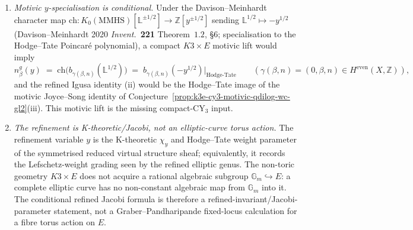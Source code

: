 \begin{proposition}
\begin{enumerate}[label=\textup{(\roman*)},leftmargin=1.5em]
\[\]
where $\chi_{10}(q, \tilde q, p; y)$ is the refined Jacobi/paramodular lift of the refined elliptic-genus input \(\phi_{0,1}^{\mathrm{ref}}=\phi_{0,1}-(y-2+y^{-1})\phi_{-2,1}\), and \(C^{\mathrm{ref}}|_{y=1}=C\). Specialising \(y=1\) recovers the primitive reduced Igusa scalar of Proposition~\ref{prop:k3e-cy3-pt-stable-pairs-cosection}(ii).
\item \emph{Motivic \(y\)-specialisation is conditional.} Under the Davison--Meinhardt character map $\mathrm{ch} \colon K_{0}(\mathrm{MMHS})[\mathbb L^{\pm 1/2}] \to \mathbb Z[y^{\pm 1/2}]$ sending $\mathbb L^{1/2} \mapsto -y^{1/2}$ \textup{(}Davison--Meinhardt 2020 \emph{Invent.}~\textbf{221} Theorem~$1.2$, \S 6; specialisation to the Hodge--Tate Poincar\'e polynomial\textup{)}, a compact \(K3\times E\) motivic lift would imply
\[
 n^{g}_{\beta}(y) \;=\; \mathrm{ch}\!\bigl(b_{\gamma(\beta, n)}(\mathbb L^{1/2})\bigr) \;=\; b_{\gamma(\beta, n)}(-y^{1/2}) \big|_{\mathrm{Hodge\text{-}Tate}} \qquad (\gamma(\beta, n) = (0, \beta, n) \in H^{\mathrm{even}}(X, \mathbb Z)),
\]
and the refined Igusa identity \textup{(ii)} would be the Hodge--Tate image of the motivic Joyce--Song identity of Conjecture~\ref{prop:k3e-cy3-motivic-qdilog-wc-gl2}(iii). This motivic lift is the missing compact-CY$_3$ input.
\item \emph{The refinement is K-theoretic/Jacobi, not an elliptic-curve torus action.} The refinement variable $y$ is the K-theoretic $\chi_y$ and Hodge--Tate weight parameter of the symmetrised reduced virtual structure sheaf; equivalently, it records the Lefschetz-weight grading seen by the refined elliptic genus. The non-toric geometry $K3 \times E$ does not acquire a rational algebraic subgroup $\mathbb G_m \hookrightarrow E$: a complete elliptic curve has no non-constant algebraic map from $\mathbb G_m$ into it. The conditional refined Jacobi formula is therefore a refined-invariant/Jacobi-parameter statement, not a Graber--Pandharipande fixed-locus calculation for a fibre torus action on $E$.
\end{enumerate}
\end{proposition}

